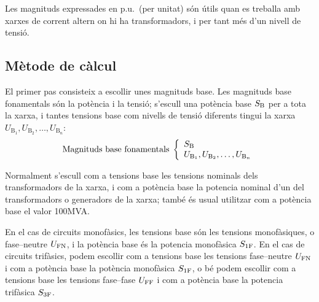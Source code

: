 Les magnituds expressades en p.u.\ (per unitat) s\'{o}n \'{u}tils quan es treballa
amb xarxes de corrent altern on hi ha transformadors, i per tant m\'{e}s d'un nivell de tensi\'{o}.

\subsection{M\`{e}tode de c\`{a}lcul} 

 El primer pas consisteix a
escollir unes magnituds base. Les magnituds base fonamentals s\'{o}n la
pot\`{e}ncia i la tensi\'{o}; s'escull una pot\`{e}ncia base $S_\mathrm{B}$ per a
tota la xarxa, i tantes tensions base com nivells de tensi\'{o}
diferents tingui la xarxa $U_{\text{B}_1}, U_{\text{B}_2}, \ldots,
U_{\text{B}_n}$:
\begin{equation}
   \text{Magnituds base fonamentals}\;\left\{
\begin{array}{l}
   S_\mathrm{B} \\
   U_{\text{B}_1}, U_{\text{B}_2}, \ldots, U_{\text{B}_n}
\end{array}
\right.
\end{equation}

Normalment s'escull com a tensions base les tensions nominals dels transformadors de la
xarxa, i com a pot\`{e}ncia base la potencia nominal d'un del transformadors o generadors de la xarxa; tamb\'{e} \'{e}s usual utilitzar com a pot\`{e}ncia base el valor 100\unit{MVA}.

En el cas de circuits monof\`{a}sics, les tensions base s\'{o}n les tensions monof\`{a}siques, o fase--neutre $U_\mathrm{FN}$, i la pot\`{e}ncia base \'{e}s la potencia monof\`{a}sica $S_\mathrm{1F}$. En el cas de circuits trif\`{a}sics, podem escollir com a tensions base les tensions fase--neutre $U_\mathrm{FN}$ i com a pot\`{e}ncia base la pot\`{e}ncia  monof\`{a}sica $S_\mathrm{1F}$, o b\'{e} podem escollir com a tensions base les tensions fase--fase $U_\mathrm{FF}$ i com a pot\`{e}ncia base la potencia trif\`{a}sica $S_\mathrm{3F}$.

